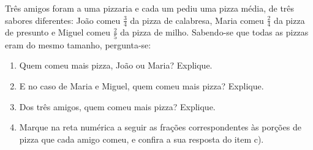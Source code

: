 \begin{atividade}{}

Três amigos foram a uma pizzaria e cada um pediu uma pizza média, de três sabores diferentes: João comeu $\frac{3}{4}$ da pizza de calabresa, Maria comeu  $\frac{2}{4}$ da pizza de presunto e Miguel comeu $\frac{2}{5}$ da pizza de milho. Sabendo-se que todas as pizzas eram do mesmo tamanho, pergunta-se:
\begin{enumerate} [\quad a)] %
  \item     Quem comeu mais pizza, João ou Maria? Explique.
  \item     E no caso de Maria e Miguel, quem comeu mais pizza? Explique.
  \item     Dos três amigos, quem comeu mais pizza? Explique.
  \item     Marque na reta numérica a seguir as frações correspondentes às porções de pizza que cada amigo comeu, e confira a sua resposta do item c).
\end{enumerate} %

\begin{center}
\end{center}
\end{atividade}

